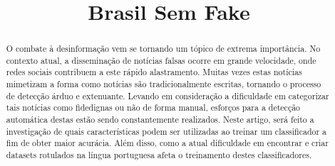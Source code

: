 \documentclass[conference]{IEEEtran}
\begin{document}
\title{Brasil Sem Fake\\
}

\author{
\and
{}
\and
{}
\and
{}
}

\maketitle

\begin{abstract}
O combate à desinformação vem se tornando um tópico de extrema importância. No contexto atual, a disseminação de notícias falsas ocorre em grande velocidade, onde redes sociais contribuem a este rápido alastramento. Muitas vezes estas notícias mimetizam a forma como notícias são tradicionalmente escritas, tornando o processo de detecção árduo e extenuante. Levando em consideração a dificuldade em categorizar tais notícias como fidedignas ou não de forma manual, esforços para a detecção automática destas estão sendo constantemente realizados. Neste artigo, será feito a investigação de quais características podem ser utilizadas ao treinar um classificador a fim de obter maior acurácia. Além disso, como a atual dificuldade em encontrar e criar datasets rotulados na língua portuguesa afeta o treinamento destes classificadores.
\end{abstract}
\end{document}
